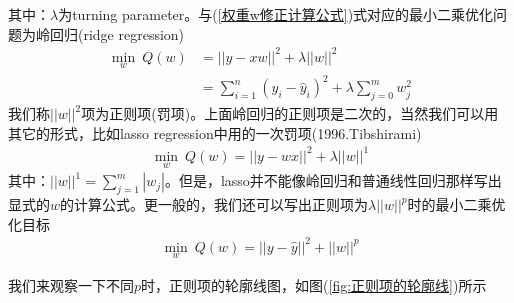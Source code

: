         其中：$\lambda$为turning parameter。与(\ref{权重w修正计算公式})式对应的最小二乘优化问题为岭回归(ridge regression)
        \begin{align*}
        \min_w\ Q(w) &= ||y - x w||^2 + \lambda ||w||^2\\
        &= \sum_{i=1}^n(y_i-\hat{y}_i)^2+\lambda\sum_{j = 0}^m w_j^2
        \end{align*}
        我们称$||w||^2$项为正则项(罚项)。上面岭回归的正则项是二次的，当然我们可以用其它的形式，比如lasso regression中用的一次罚项(1996.Tibshirami)
        \begin{align*}
        \min_w \ Q(w) = ||y  - wx||^2+\lambda||w||^1
        \end{align*}
        其中：$||w||^1 =\sum_{j=1}^m |w_j|$。但是，lasso并不能像岭回归和普通线性回归那样写出显式的$w$的计算公式。更一般的，我们还可以写出正则项为$\lambda||w||^p$时的最小二乘优化目标
        \begin{align*}
        \min_w \ Q(w) = ||y-\hat{y}||^2 + ||w||^p
        \end{align*}
        \par
        我们来观察一下不同$p$时，正则项的轮廓线图，如图(\ref{fig:正则项的轮廓线})所示
